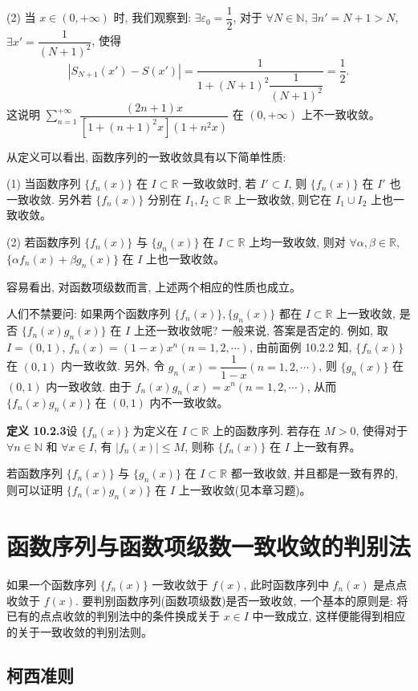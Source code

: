 \documentclass[UTF8, 12pt, fontset=fandol, oneside]{ctexart}
\begin{document}
(2) 当 $x\in(0,+\infty)$ 时, 我们观察到: $\exists\varepsilon_0=\dfrac12$, 对于 $\forall N\in\mathbb N$, $\exists n'=N+1>N$, $\exists x'=\dfrac1{(N+1)^2}$, 使得
\[
  |S_{N+1}(x')-S(x')|=\frac1{1+(N+1)^2\dfrac1{(N+1)^2}}=\frac12.
\]
这说明 $\sum\limits_{n=1}^{+\infty}\dfrac{(2n+1)x}{[1+(n+1)^2x](1+n^2x)}$ 在 $(0,+\infty)$ 上不一致收敛。

从定义可以看出, 函数序列的一致收敛具有以下简单性质:

(1) 当函数序列 $\{f_n(x)\}$ 在 $I\subset\mathbb R$ 一致收敛时, 若 $I'\subset I$, 则 $\{f_n(x)\}$ 在 $I'$ 也一致收敛. 另外若 $\{f_n(x)\}$ 分别在 $I_1,I_2\subset\mathbb R$ 上一致收敛, 则它在 $I_1\cup I_2$ 上也一致收敛。

(2) 若函数序列 $\{f_n(x)\}$ 与 $\{g_n(x)\}$ 在 $I\subset\mathbb R$ 上均一致收敛, 则对 $\forall\alpha,\beta\in\mathbb R$, $\{\alpha f_n(x)+\beta g_n(x)\}$ 在 $I$ 上也一致收敛。

容易看出, 对函数项级数而言, 上述两个相应的性质也成立。

人们不禁要问: 如果两个函数序列 $\{f_n(x)\},\{g_n(x)\}$ 都在 $I\subset\mathbb R$ 上一致收敛, 是否 $\{f_n(x)g_n(x)\}$ 在 $I$ 上还一致收敛呢? 一般来说, 答案是否定的. 例如, 取 $I=(0,1)$, $f_n(x)=(1-x)x^n(n=1,2,\cdots)$, 由前面例 10.2.2 知, $\{f_n(x)\}$ 在 $(0,1)$ 内一致收敛. 另外, 令 $g_n(x)=\dfrac1{1-x}(n=1,2,\cdots)$, 则 $\{g_n(x)\}$ 在 $(0,1)$ 内一致收敛. 由于 $f_n(x)g_n(x)=x^n(n=1,2,\cdots)$, 从而 $\{f_n(x)g_n(x)\}$ 在 $(0,1)$ 内不一致收敛。

\noindent\textbf{定义 10.2.3}\quad 设 $\{f_n(x)\}$ 为定义在 $I\subset\mathbb R$ 上的函数序列. 若存在 $M>0$, 使得对于 $\forall n\in\mathbb N$ 和 $\forall x\in I$, 有 $|f_n(x)|\leq M$, 则称 $\{f_n(x)\}$ 在 $I$ 上一致有界。

若函数序列 $\{f_n(x)\}$ 与 $\{g_n(x)\}$ 在 $I\subset\mathbb R$ 都一致收敛, 并且都是一致有界的, 则可以证明 $\{f_n(x)g_n(x)\}$ 在 $I$ 上一致收敛(见本章习题)。

\section{函数序列与函数项级数一致收敛的判别法}

如果一个函数序列 $\{f_n(x)\}$ 一致收敛于 $f(x)$, 此时函数序列中 $f_n(x)$ 是点点收敛于 $f(x)$. 要判别函数序列(函数项级数)是否一致收敛, 一个基本的原则是: 将已有的点点收敛的判别法中的条件换成关于 $x\in I$ 中一致成立, 这样便能得到相应的关于一致收敛的判别法则。

\subsection{柯西准则}
\end{document}
